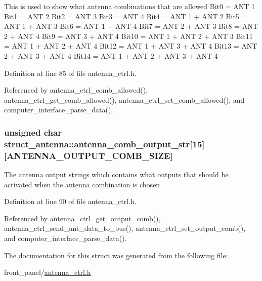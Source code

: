 This is used to show what antenna combinations that are allowed Bit0 = ANT 1 Bit1 = ANT 2 Bit2 = ANT 3 Bit3 = ANT 4 Bit4 = ANT 1 + ANT 2 Bit5 = ANT 1 + ANT 3 Bit6 = ANT 1 + ANT 4 Bit7 = ANT 2 + ANT 3 Bit8 = ANT 2 + ANT 4 Bit9 = ANT 3 + ANT 4 Bit10 = ANT 1 + ANT 2 + ANT 3 Bit11 = ANT 1 + ANT 2 + ANT 4 Bit12 = ANT 1 + ANT 3 + ANT 4 Bit13 = ANT 2 + ANT 3 + ANT 4 Bit14 = ANT 1 + ANT 2 + ANT 3 + ANT 4 

Definition at line 85 of file antenna\_\-ctrl.h.

Referenced by antenna\_\-ctrl\_\-comb\_\-allowed(), antenna\_\-ctrl\_\-get\_\-comb\_\-allowed(), antenna\_\-ctrl\_\-set\_\-comb\_\-allowed(), and computer\_\-interface\_\-parse\_\-data().\hypertarget{structstruct__antenna_b07514740fffae4fcfa8800f8c37547e}{
\subsubsection[{antenna\_\-comb\_\-output\_\-str}]{\setlength{\rightskip}{0pt plus 5cm}unsigned char {\bf struct\_\-antenna::antenna\_\-comb\_\-output\_\-str}\mbox{[}15\mbox{]}\mbox{[}ANTENNA\_\-OUTPUT\_\-COMB\_\-SIZE\mbox{]}}}
\label{structstruct__antenna_b07514740fffae4fcfa8800f8c37547e}


The antenna output strings which contains what outputs that should be activated when the antenna combination is chosen 

Definition at line 90 of file antenna\_\-ctrl.h.

Referenced by antenna\_\-ctrl\_\-get\_\-output\_\-comb(), antenna\_\-ctrl\_\-send\_\-ant\_\-data\_\-to\_\-bus(), antenna\_\-ctrl\_\-set\_\-output\_\-comb(), and computer\_\-interface\_\-parse\_\-data().

The documentation for this struct was generated from the following file:\begin{CompactItemize}
\item 
front\_\-panel/\hyperlink{antenna__ctrl_8h}{antenna\_\-ctrl.h}\end{CompactItemize}
